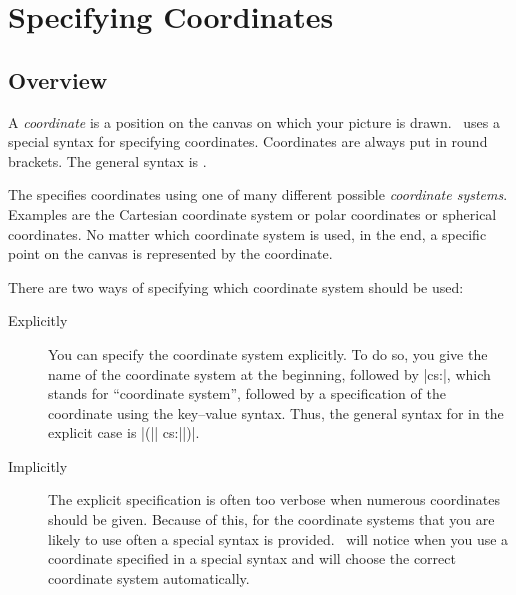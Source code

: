 %
%
%


\section[tikz-coordinates]{Specifying Coordinates}

\subsection{Overview}

A \emph{coordinate} is a position on the canvas on which your picture is drawn.
\tikzname\ uses a special syntax for specifying coordinates. Coordinates are
always put in round brackets. The general syntax is
.

The  specifies coordinates using one of many
different possible \emph{coordinate systems}. Examples are the Cartesian
coordinate system or polar coordinates or spherical coordinates. No matter
which coordinate system is used, in the end, a specific point on the canvas is
represented by the coordinate.

There are two ways of specifying which coordinate system should be used:
%
\begin{description}
    \item[Explicitly] You can specify the coordinate system explicitly. To do
        so, you give the name of the coordinate system at the beginning,
        followed by |cs:|, which stands for ``coordinate system'', followed by
        a specification of the coordinate using the key--value syntax. Thus,
        the general syntax for  in the explicit
        case is |(|| cs:||)|.
    \item[Implicitly] The explicit specification is often too verbose when
        numerous coordinates should be given. Because of this, for the
        coordinate systems that you are likely to use often a special syntax
        is provided. \tikzname\ will notice when you use a coordinate
        specified in a special syntax and will choose the correct coordinate
        system automatically.
\end{description}

